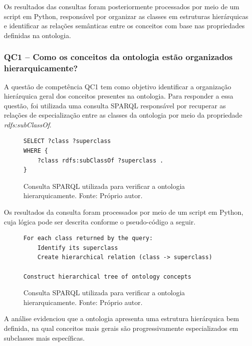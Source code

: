 Os resultados das consultas foram posteriormente processados por meio de um script em Python, responsável por organizar as classes em estruturas hierárquicas e identificar as relações semânticas entre os conceitos com base nas propriedades definidas na ontologia.

\subsubsection{QC1 – Como os conceitos da ontologia estão organizados hierarquicamente?}

A questão de competência QC1 tem como objetivo identificar a organização hierárquica geral dos conceitos presentes na ontologia. Para responder a essa questão, foi utilizada uma consulta SPARQL responsável por recuperar as relações de especialização entre as classes da ontologia por meio da propriedade \textit{rdfs:subClassOf}.

\begin{figure}[H]
\centering
\begin{minipage}{0.7\linewidth}
\begin{verbatim}
SELECT ?class ?superclass
WHERE {
    ?class rdfs:subClassOf ?superclass .
}
\end{verbatim}
\end{minipage}
\caption{Consulta SPARQL utilizada para verificar a ontologia hierarquicamente. Fonte: Próprio autor.}
\label{fig:avaliacao_sparql_qc1}
\end{figure}

Os resultados da consulta foram processados por meio de um script em Python, cuja lógica pode ser descrita conforme o pseudo-código a seguir.

\begin{figure}[H]
\centering
\begin{minipage}{0.7\linewidth}
\begin{verbatim}
For each class returned by the query:
    Identify its superclass
    Create hierarchical relation (class -> superclass)

Construct hierarchical tree of ontology concepts
\end{verbatim}
\end{minipage}
\caption{Consulta SPARQL utilizada para verificar a ontologia hierarquicamente. Fonte: Próprio autor.}
\label{fig:avaliacao_script_qc1}
\end{figure}

A análise evidenciou que a ontologia apresenta uma estrutura hierárquica bem definida, na qual conceitos mais gerais são progressivamente especializados em subclasses mais específicas.

